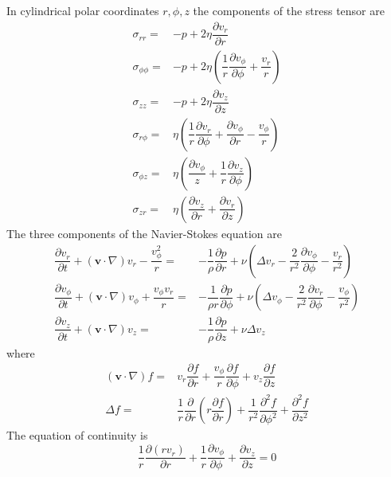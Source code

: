 \documentclass[conference]{IEEEtran}
\theoremstyle{definition}
\theoremstyle{remark}
\begin{document}
    In cylindrical polar coordinates $r, \phi, z$ the components of the stress tensor are
    \begin{equation}
        \begin{aligned}
        \sigma_{rr} =& -p + 2 \eta \dfrac{\partial v_r}{\partial r} \\
        \sigma_{\phi\phi} =& -p + 2\eta \left( \dfrac{1}{r} \dfrac{\partial v_{\phi}}{\partial \phi} + \dfrac{v_r}{r} \right) \\
        \sigma_{zz} =& -p + 2\eta \dfrac{\partial v_z}{\partial z} \\
        \sigma_{r\phi} =& \eta \left( \dfrac1r \dfrac{\partial v_r}{\partial \phi} + \dfrac{\partial v_\phi}{\partial r} - \dfrac{v_\phi}{r} \right) \\
        \sigma_{\phi z} =& \eta \left( \dfrac{\partial v_\phi}{z} + \dfrac1r \dfrac{\partial v_z}{\partial \phi} \right) \\
        \sigma_{zr} =& \eta \left( \dfrac{\partial v_z}{\partial r} + \dfrac{\partial v_r}{\partial z} \right)
        \end{aligned}
    \end{equation}
    The three components of the Navier-Stokes equation are
    \begin{align}
        \dfrac{\partial v_r}{\partial t} + (\mathbf{v} \cdot \nabla) v_r - \dfrac{v_{\phi}^2}{r} =& -\dfrac1\rho \dfrac{\partial p}{\partial r} + \nu \left( \Delta v_r - \dfrac2{r^2} \dfrac{\partial v_{\phi}}{\partial \phi} - \dfrac{v_r}{r^2} \right) \nonumber \\
        \dfrac{\partial v_{\phi}}{\partial t} + (\mathbf{v} \cdot \nabla) v_{\phi} + \dfrac{v_{\phi}v_r}{r} =& -\dfrac1{\rho r} \dfrac{\partial p}{\partial \phi} + \nu \left( \Delta v_{\phi} - \dfrac2{r^2} \dfrac{\partial v_r}{\partial \phi} - \dfrac{v_{\phi}}{r^2} \right) \nonumber \\
        \dfrac{\partial v_z}{\partial t} + (\mathbf{v} \cdot \nabla) v_z =& -\dfrac1\rho \dfrac{\partial p}{\partial z} + \nu \Delta v_z
    \end{align}
    where
    \begin{align*}
        (\mathbf{v} \cdot \nabla) f =& v_r \dfrac{\partial f}{\partial r} + \dfrac{v_{\phi}}{r} \dfrac{\partial f}{\partial \phi} + v_z \dfrac{\partial f}{\partial z} \\
        \Delta f =& \dfrac1r \dfrac{\partial}{\partial r}\left( r \dfrac{\partial f}{\partial r} \right) + \dfrac1{r^2} \dfrac{\partial^2 f}{\partial \phi^2} + \dfrac{\partial^2 f}{\partial z^2}
    \end{align*}
    The equation of continuity is
    \begin{equation}
        \dfrac1r \dfrac{\partial (rv_r)}{\partial r} + \dfrac1r \dfrac{\partial v_\phi}{\partial \phi} + \dfrac{\partial v_z}{\partial z} = 0
    \end{equation}
\end{document}
